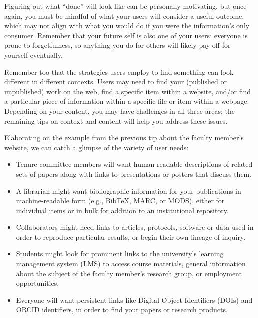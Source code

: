 \documentclass[10pt,letterpaper]{article}
\begin{document}
Figuring out what ``done'' will look like can be personally motivating, but once
again, you must be mindful of what your users will consider a useful outcome, which
may not align with what you would do if you were the information's only consumer.
Remember that your future self is also one of your users: everyone is prone to 
forgetfulness, so anything you do for others will likely pay off for yourself
eventually\cite{Briney2015}.

Remember too that the strategies users employ to find something can look different 
in different contexts. Users may need to find your (published or unpublished)
work on the web, find a specific item within a website, and/or find a particular 
piece of information within a specific file or item within a webpage. Depending on 
your content, you may have challenges in all three areas; the remaining tips on 
context and content will help you address these issues.

Elaborating on the example from the previous tip about the faculty member's website, 
we can catch a glimpse of the variety of user needs:

\begin{itemize}

\item
  Tenure committee members will want human-readable descriptions of related sets
  of papers along with links to presentations or posters that discuss them.
 
\item
  A librarian might want bibliographic information for your publications in
  machine-readable form (e.g., BibTeX, MARC, or MODS), either for individual
  items or in bulk for addition to an institutional repository.

\item
  Collaborators might need links to articles, protocols, software or 
  data used in order to reproduce particular results, or begin
  their own lineage of inquiry.

\item
  Students might look for prominent links to the university's learning management
  system (LMS) to access course materials, general information about the subject 
  of the faculty member's research group, or employment opportunities. 
  
  \item
  Everyone will want persistent links like Digital Object Identifiers (DOIs) \cite{DOI2020} 
  and ORCID \cite{ORCID2020} identifiers, in order to find your papers or research products.

\end{itemize}
\end{document}
